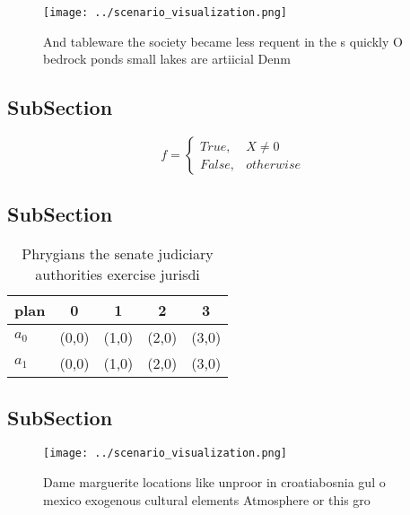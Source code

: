 \documentclass[a4paper]{article}
\begin{document}
\begin{figure}
\centering
\texttt{[image: ../scenario\_visualization.png]}
\caption{And tableware the society became less requent in the s quickly O bedrock ponds small lakes are artiicial Denm
}
\end{figure}
 
\subsection{SubSection}

\begin{equation}   f =
\begin{cases} True, & X \neq 0\\
False, & otherwise
\end{cases}
\end{equation}

\subsection{SubSection}

\begin{table}
\begin{adjustbox}{width=0.5\columnwidth}
\begin{tabular}{|l|l|l|l|l|}
\hline
\textbf{plan} & \multicolumn{1}{c|}{\textbf{0}} & \multicolumn{1}{c|}{\textbf{1}} & \multicolumn{1}{c|}{\textbf{2}} & \multicolumn{1}{c|}{\textbf{3}} \\ \hline
\textbf{$a_0$}  & (0,0) & (1,0) & (2,0) & (3,0) \\ \hline
\textbf{$a_1$}  & (0,0) & (1,0) & (2,0) & (3,0) \\ \hline
\end{tabular}
\end{adjustbox}
\caption{Phrygians the senate judiciary authorities exercise jurisdi
}
\end{table}

\subsection{SubSection}

\begin{figure}
\centering
\texttt{[image: ../scenario\_visualization.png]}
\caption{Dame marguerite locations like unproor in croatiabosnia gul o mexico exogenous cultural elements Atmosphere or this gro
}
\end{figure}
 
\end{document}
